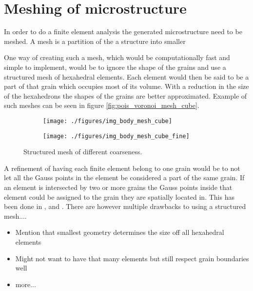 \documentclass[meshing_micro.tex]{subfiles}
\begin{document}
\chapter{Meshing of microstructure}

In order to do a finite element analysis the generated microstructure need to be meshed. A mesh is a partition of the a structure into smaller 

One way of creating such a mesh, which would be computationally fast and simple to implement, would be to ignore the shape of the grains and use a structured mesh of hexahedral elements. Each element would then be said to be a part of that grain which occupies most of its volume. With a reduction in the size of the hexahedrons the shapes of the grains are better approximated. Example of such meshes can be seen in figure \ref{fig:pois_voronoi_mesh_cube}.

\begin{figure}
\centering
\begin{subfigure}[b]{.5\textwidth}
  \centering
  \texttt{[image: ./figures/img\_body\_mesh\_cube]}
  \caption{}
  \label{fig:mesh_a}
\end{subfigure}%
\begin{subfigure}[b]{.5\textwidth}
  \centering
  \texttt{[image: ./figures/img\_body\_mesh\_cube\_fine]}
  \caption{}
  \label{fig:mesh_b}
\end{subfigure}
\caption{Structured mesh of different coarseness.}
\label{fig:mesh}
\end{figure}

A refinement of having each finite element belong to one grain would be to not let all the Gauss points in the element be considered a part of the same grain. If an element is intersected by two or more grains the Gauss points inside that element could be assigned to the grain they are spatially located in. This has been done in \cite{Nygards20031049}, \cite{Cailletaud2003351} and \cite{Barbe2001513}. There are however multiple drawbacks to using a structured mesh....

\begin{itemize}
\item Mention that smallest geometry determines the size off all hexahedral elements
\item Might not want to have that many elements but still respect grain boundaries well
\item more...
\end{itemize}
\end{document}
